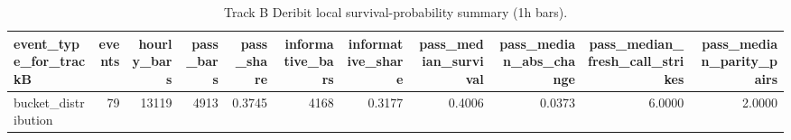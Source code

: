 \begin{table}
\caption{Track B Deribit local survival-probability summary (1h bars).}
\label{tab:trackB_deribit_survival_summary}
\begin{tabular}{lrrrrrrrrrr}
\toprule
event\_type\_for\_trackB & events & hourly\_bars & pass\_bars & pass\_share & informative\_bars & informative\_share & pass\_median\_survival & pass\_median\_abs\_change & pass\_median\_fresh\_call\_strikes & pass\_median\_parity\_pairs \\
\midrule
bucket\_distribution & 79 & 13119 & 4913 & 0.3745 & 4168 & 0.3177 & 0.4006 & 0.0373 & 6.0000 & 2.0000 \\
\bottomrule
\end{tabular}
\end{table}
